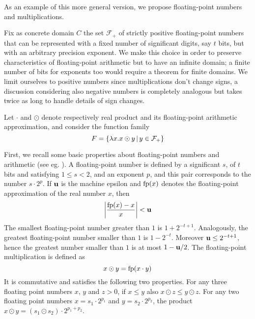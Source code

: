 As an example of this more general version, we propose floating-point numbers and multiplications.
\begin{example}\label{ch4:ex:fp-numbers-local}
	Fix as concrete domain $C$ the set $\mathcal{F_+}$ of strictly positive floating-point numbers that can be represented with a fixed number of significant digits, say $t$ bits, but with an arbitrary precision exponent. We make this choice in order to preserve characteristics of floating-point arithmetic but to have an infinite domain; a finite number of bits for exponents too would require a theorem for finite domains. We limit ourselves to positive numbers since multiplications don't change signs, a discussion considering also negative numbers is completely analogous but takes twice as long to handle details of sign changes.

	Let $\cdot$ and $\odot$ denote respectively real product and its floating-point arithmetic approximation, and consider the function family
	\[
	F = \{ \lambda x . x \odot y \,\vert\, y \in \mathcal{F_+} \}
	\]

	First, we recall some basic properties about floating-point numbers and arithmetic (see eg. \cite{overton-num-analysis-book}). A floating-point number is defined by a significant $s$, of $t$ bits and satisfying $1 \le s < 2$, and an exponent $p$, and this pair corresponds to the number $s \cdot 2^p$. If $\textbf{u}$ is the machine epsilon and $\text{fp}(x)$ denotes the floating-point approximation of the real number $x$, then
	\[
	\left\lvert \frac{\text{fp}(x) - x}{x} \right\rvert < \textbf{u}
	\]
	The smallest floating-point number greater than $1$ is $1 + 2^{-t+1}$. Analogously, the greatest floating-point number smaller than $1$ is $1 - 2^{-t}$. Moreover $\textbf{u} \le 2^{-t+1}$, hence the greatest number smaller than $1$ is at most $1 - \textbf{u} / 2$.
	The floating-point multiplication is defined as
	\[
	x \odot y = \text{fp}(x \cdot y)
	\]
	It is commutative and satisfies the following two properties.
	For any three floating point numbers $x$, $y$ and $z > 0$, if $x \le y$ also $x \odot z \le y \odot z$.
	For any two floating point numbers $x = s_1 \cdot 2^{p_1}$ and $y = s_2 \cdot 2^{p_2}$, the product $x \odot y = (s_1 \odot s_2) \cdot 2^{p_1 + p_2}$.


\end{example}
